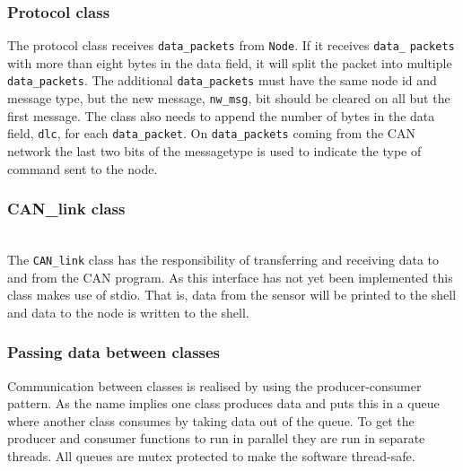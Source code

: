 \subsubsection*{Protocol class}

The protocol class receives \texttt{data\_packets} from \texttt{Node}. 
If it receives \texttt{data\_} \texttt{packets} with more than eight bytes in the data field, it will split the packet into multiple \texttt{data\_packets}.
The additional \texttt{data\_packets} must have the same node id and message type, but the new message, \texttt{nw\_msg}, bit should be cleared on all but the first message.
The class also needs to append the number of bytes in the data field, \texttt{dlc}, for each \texttt{data\_packet}.
On \texttt{data\_packets} coming from the CAN network the last two bits of the messagetype is used to indicate the type of command sent to the node.

\subsubsection*{CAN\_link class} ~ \\
The \texttt{CAN\_link} class has the responsibility of transferring and receiving data to and from the CAN program.
As this interface has not yet been implemented this class makes use of stdio. 
That is, data from the sensor will be printed to the shell and data to the node is written to the shell. 
\subsubsection*{Passing data between classes}
Communication between classes is realised by using the producer-consumer pattern.
As the name implies one class produces data and puts this in a queue where another class consumes by taking data out of the queue.
To get the producer and consumer functions to run in parallel they are run in separate threads.
All queues are mutex protected to make the software thread-safe.

